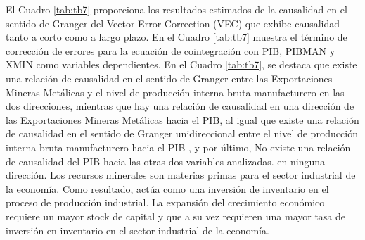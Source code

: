 \documentclass[11pt,]{article}
\begin{document}
El Cuadro \ref{tab:tb7} proporciona los resultados estimados de la
causalidad en el sentido de Granger del Vector Error Correction (VEC)
que exhibe causalidad tanto a corto como a largo plazo. En el Cuadro
\ref{tab:tb7} muestra el término de corrección de errores para la
ecuación de cointegración con PIB, PIBMAN y XMIN como variables
dependientes. En el Cuadro \ref{tab:tb7}, se destaca que existe una
relación de causalidad en el sentido de Granger entre las Exportaciones
Mineras Metálicas y el nivel de producción interna bruta manufacturero
en las dos direcciones, mientras que hay una relación de causalidad en
una dirección de las Exportaciones Mineras Metálicas hacia el PIB, al
igual que existe una relación de causalidad en el sentido de Granger
unidireccional entre el nivel de producción interna bruta manufacturero
hacia el PIB , y por último, No existe una relación de causalidad del
PIB hacia las otras dos variables analizadas. en ninguna dirección. Los
recursos minerales son materias primas para el sector industrial de la
economía. Como resultado, actúa como una inversión de inventario en el
proceso de producción industrial. La expansión del crecimiento económico
requiere un mayor stock de capital y que a su vez requieren una mayor
tasa de inversión en inventario en el sector industrial de la economía.
\end{document}

